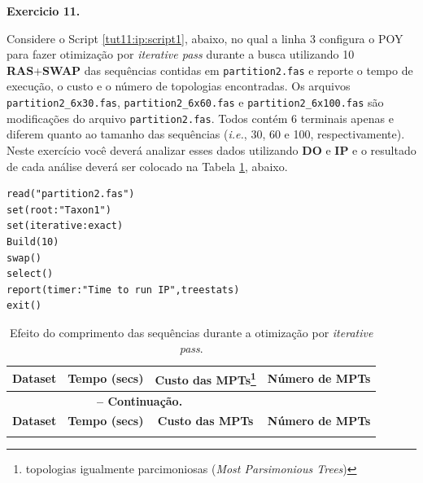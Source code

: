 \begin{refsection}
\begin{blackBlock}{\textbf{Exercicio 11.}}\label{tut11:ex:11.1}

Considere o Script \ref{tut11:ip:script1}, abaixo, no qual a linha 3 configura o POY para fazer otimização por \textit{iterative pass} durante a busca utilizando 10 \textbf{RAS}+\textbf{SWAP} das sequências contidas em \texttt{partition2.fas} e reporte o tempo de execução, o custo e o número de topologias encontradas. Os arquivos \texttt{partition2\_6x30.fas}, \texttt{partition2\_6x60.fas} e \texttt{partition2\_6x100.fas} são modificações do arquivo \texttt{partition2.fas}. Todos contém 6 terminais apenas e diferem quanto ao tamanho das sequências (\textit{i.e.}, 30, 60 e 100, respectivamente). Neste exercício você deverá analizar esses dados utilizando \textbf{DO} e \textbf{IP} e o resultado de cada análise deverá ser colocado na Tabela \ref{tut11:table:ip:time:ex1}, abaixo.

\end{blackBlock}

\begin{lstlisting}[caption= Exemplo de \textit{script} para implementar \textit{iterative pass}.,label=tut11:ip:script1]
read("partition2.fas")
set(root:"Taxon1")
set(iterative:exact)
Build(10)
swap()
select()
report(timer:"Time to run IP",treestats)
exit()
\end{lstlisting}


\pagestyle{fancy}
\begin{center}

\begin{longtable}{|l|c|c|c|}
\caption[Tempo de execução em \textbf{IP}]{Efeito do comprimento das sequências durante a otimização por \textit{iterative pass}.} \label{tut11:table:ip:time:ex1} \\


\hline\hline \textbf{Dataset} & \textbf{Tempo (secs)}  & \textbf{Custo das MPTs\footnote{ topologias igualmente parcimoniosas (\textit{Most Parsimonious Trees})}} & \textbf{Número de MPTs} \\
\endfirsthead

\multicolumn{3}{c}{{\bfseries \tablename\ \thetable{} -- Continuação.}}\\
\hline\hline \textbf{Dataset} & \textbf{Tempo (secs)}  & \textbf{Custo das MPTs} & \textbf{Número de MPTs} \\
\endhead
\hline \hline
\endlastfoot


\end{longtable}
\end{center}
\end{refsection}
